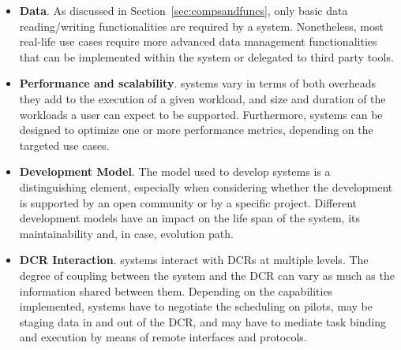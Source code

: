 \documentclass{sig-alternate}
\begin{document}
\begin{itemize}


\item \textbf{Data}. As discussed in Section~\ref{sec:compsandfuncs}, only
  basic data reading/writing functionalities are required by a
  \pilot system. Nonetheless, most real-life use cases require more
  advanced data management functionalities that can be implemented within the
  \pilot system or delegated to third party tools.

\item \textbf{Performance and scalability}. \pilot systems vary in
  terms of  both overheads they add to the execution of a given workload, and
  size and duration of the workloads a user can expect to be supported.
  Furthermore, \pilot systems can be designed to optimize one or more
  performance metrics, depending on the targeted use cases.

\item \textbf{Development Model}. The model used to develop \pilot systems is a
  distinguishing element, especially when considering whether the development is
  supported by an open community or by a specific project. Different development
  models have an impact on the life span of the \pilot system, its
  maintainability and, in case, evolution path.

\item \textbf{DCR Interaction}. \pilot systems interact with DCRs at multiple
  levels. The degree of coupling between the \pilot system and the DCR can vary
  as much as the information shared between them. Depending on the capabilities
  implemented, \pilot systems have to negotiate the scheduling on pilots, may be
  staging data in and out of the DCR, and may have to mediate task binding and
  execution by means of remote interfaces and protocols.

\end{itemize}
\end{document}
